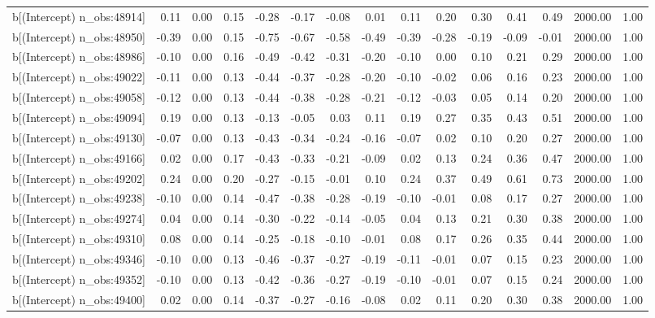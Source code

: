 \begin{table}[ht]
\begin{tabular}{rrrrrrrrrrrrrrr}
  b[(Intercept) n\_obs:48914] & 0.11 & 0.00 & 0.15 & -0.28 & -0.17 & -0.08 & 0.01 & 0.11 & 0.20 & 0.30 & 0.41 & 0.49 & 2000.00 & 1.00 \\ 
  b[(Intercept) n\_obs:48950] & -0.39 & 0.00 & 0.15 & -0.75 & -0.67 & -0.58 & -0.49 & -0.39 & -0.28 & -0.19 & -0.09 & -0.01 & 2000.00 & 1.00 \\ 
  b[(Intercept) n\_obs:48986] & -0.10 & 0.00 & 0.16 & -0.49 & -0.42 & -0.31 & -0.20 & -0.10 & 0.00 & 0.10 & 0.21 & 0.29 & 2000.00 & 1.00 \\ 
  b[(Intercept) n\_obs:49022] & -0.11 & 0.00 & 0.13 & -0.44 & -0.37 & -0.28 & -0.20 & -0.10 & -0.02 & 0.06 & 0.16 & 0.23 & 2000.00 & 1.00 \\ 
  b[(Intercept) n\_obs:49058] & -0.12 & 0.00 & 0.13 & -0.44 & -0.38 & -0.28 & -0.21 & -0.12 & -0.03 & 0.05 & 0.14 & 0.20 & 2000.00 & 1.00 \\ 
  b[(Intercept) n\_obs:49094] & 0.19 & 0.00 & 0.13 & -0.13 & -0.05 & 0.03 & 0.11 & 0.19 & 0.27 & 0.35 & 0.43 & 0.51 & 2000.00 & 1.00 \\ 
  b[(Intercept) n\_obs:49130] & -0.07 & 0.00 & 0.13 & -0.43 & -0.34 & -0.24 & -0.16 & -0.07 & 0.02 & 0.10 & 0.20 & 0.27 & 2000.00 & 1.00 \\ 
  b[(Intercept) n\_obs:49166] & 0.02 & 0.00 & 0.17 & -0.43 & -0.33 & -0.21 & -0.09 & 0.02 & 0.13 & 0.24 & 0.36 & 0.47 & 2000.00 & 1.00 \\ 
  b[(Intercept) n\_obs:49202] & 0.24 & 0.00 & 0.20 & -0.27 & -0.15 & -0.01 & 0.10 & 0.24 & 0.37 & 0.49 & 0.61 & 0.73 & 2000.00 & 1.00 \\ 
  b[(Intercept) n\_obs:49238] & -0.10 & 0.00 & 0.14 & -0.47 & -0.38 & -0.28 & -0.19 & -0.10 & -0.01 & 0.08 & 0.17 & 0.27 & 2000.00 & 1.00 \\ 
  b[(Intercept) n\_obs:49274] & 0.04 & 0.00 & 0.14 & -0.30 & -0.22 & -0.14 & -0.05 & 0.04 & 0.13 & 0.21 & 0.30 & 0.38 & 2000.00 & 1.00 \\ 
  b[(Intercept) n\_obs:49310] & 0.08 & 0.00 & 0.14 & -0.25 & -0.18 & -0.10 & -0.01 & 0.08 & 0.17 & 0.26 & 0.35 & 0.44 & 2000.00 & 1.00 \\ 
  b[(Intercept) n\_obs:49346] & -0.10 & 0.00 & 0.13 & -0.46 & -0.37 & -0.27 & -0.19 & -0.11 & -0.01 & 0.07 & 0.15 & 0.23 & 2000.00 & 1.00 \\ 
  b[(Intercept) n\_obs:49352] & -0.10 & 0.00 & 0.13 & -0.42 & -0.36 & -0.27 & -0.19 & -0.10 & -0.01 & 0.07 & 0.15 & 0.24 & 2000.00 & 1.00 \\ 
  b[(Intercept) n\_obs:49400] & 0.02 & 0.00 & 0.14 & -0.37 & -0.27 & -0.16 & -0.08 & 0.02 & 0.11 & 0.20 & 0.30 & 0.38 & 2000.00 & 1.00 \\ 

\end{tabular}
\end{table}
